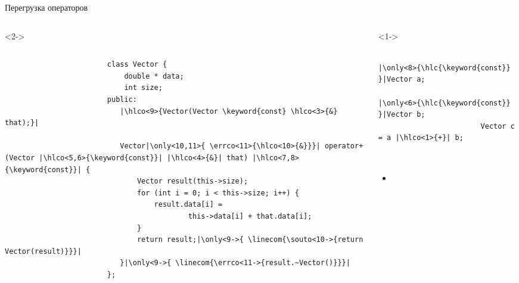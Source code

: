 \documentclass[aspectratio=169,14pt]{beamer}
\begin{document}
    \begin{frame}[fragile]{Перегрузка операторов}
        \begin{columns}[T]
            \begin{onlyenv}<2->
                \begin{column}{0.6\textwidth}
                    \begin{verbatim}
                        class Vector {
                            double * data;
                            int size;
                        public:
                           |\hlco<9>{Vector(Vector \keyword{const} \hlco<3>{&} that);}|

                           Vector|\only<10,11>{ \errco<11>{\hlco<10>{&}}}| operator+ (Vector |\hlco<5,6>{\keyword{const}}| |\hlco<4>{&}| that) |\hlco<7,8>{\keyword{const}}| {
                               Vector result(this->size);
                               for (int i = 0; i < this->size; i++) {
                                   result.data[i] =
                                           this->data[i] + that.data[i];
                               }
                               return result;|\only<9->{ \linecom{\souto<10->{return Vector(result)}}}|
                           }|\only<9->{ \linecom{\errco<11->{result.~Vector()}}}|
                        };
                    \end{verbatim}
                \end{column}
            \end{onlyenv}
            \begin{column}{0.4\textwidth}
                \begin{onlyenv}<1->
                    \begin{verbatim}
                        |\only<8>{\hlc{\keyword{const}} }|Vector a;
                        |\only<6>{\hlc{\keyword{const}} }|Vector b;
                        Vector c = a |\hlco<1>{+}| b;
                    \end{verbatim}
                \end{onlyenv}
                ~\\
                \footnotesize
                \begin{itemize}
                    \item<3->

\end{itemize}
\end{column}
\end{columns}
\end{frame}
\end{document}
